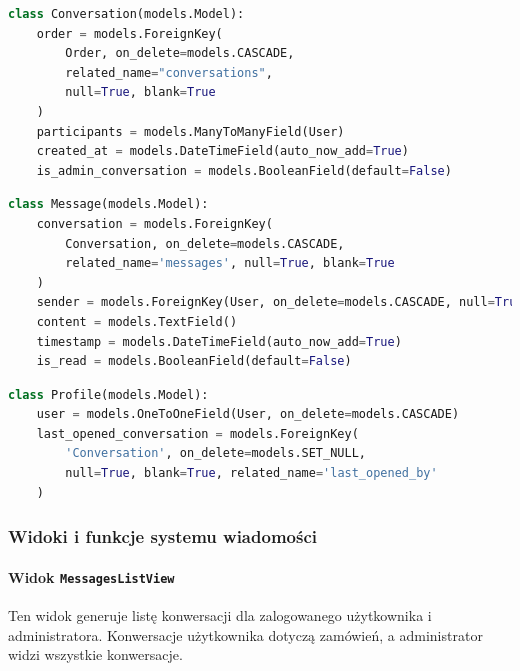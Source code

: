 \documentclass[12pt,a4paper,oneside]{article}
\theoremstyle{definition}
\numberwithin{equation}{section}
\begin{document}
\begin{lstlisting}[language=Python, caption=Model \texttt{Conversation}]
class Conversation(models.Model):
    order = models.ForeignKey(
        Order, on_delete=models.CASCADE,
        related_name="conversations",
        null=True, blank=True
    )
    participants = models.ManyToManyField(User)
    created_at = models.DateTimeField(auto_now_add=True)
    is_admin_conversation = models.BooleanField(default=False)
\end{lstlisting}

\begin{lstlisting}[language=Python, caption=Model \texttt{Message}]
class Message(models.Model):
    conversation = models.ForeignKey(
        Conversation, on_delete=models.CASCADE,
        related_name='messages', null=True, blank=True
    )
    sender = models.ForeignKey(User, on_delete=models.CASCADE, null=True)
    content = models.TextField()
    timestamp = models.DateTimeField(auto_now_add=True)
    is_read = models.BooleanField(default=False)
\end{lstlisting}

\begin{lstlisting}[language=Python, caption=Model \texttt{Profile}]
class Profile(models.Model):
    user = models.OneToOneField(User, on_delete=models.CASCADE)
    last_opened_conversation = models.ForeignKey(
        'Conversation', on_delete=models.SET_NULL,
        null=True, blank=True, related_name='last_opened_by'
    )
\end{lstlisting}



\subsubsection{Widoki i funkcje systemu wiadomości}

\paragraph{Widok \texttt{MessagesListView}}
Ten widok generuje listę konwersacji dla zalogowanego użytkownika i administratora. Konwersacje użytkownika dotyczą zamówień, a administrator widzi wszystkie konwersacje.
\end{document}
